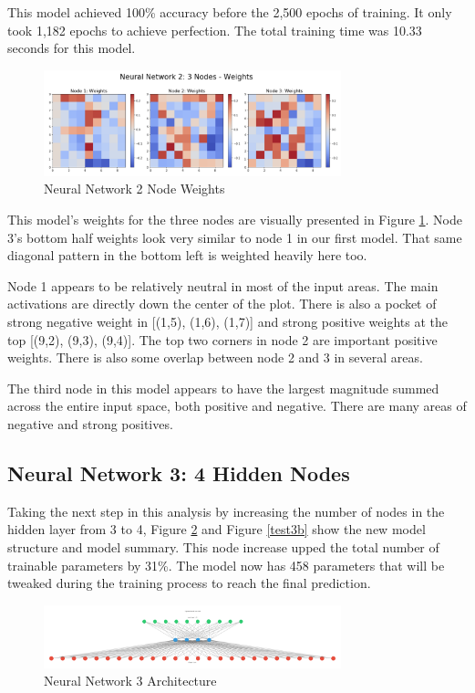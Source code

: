 \documentclass[5p,authoryear]{elsarticle}
\begin{document}
This model achieved 100\% accuracy before the 2,500 epochs of training. 
It only took 1,182 epochs to achieve perfection. 
The total training time was 10.33 seconds for this model.

\begin{figure}[!htb] \centering
	\includegraphics[width=3.4in]{figures/nn2_weights.png}
	\caption[]{Neural Network 2 Node Weights} 
	\label{test2d}
\end{figure}

This model’s weights for the three nodes are visually presented in Figure \ref{test2d}. 
Node 3’s bottom half weights look very similar to node 1 in our first model. 
That same diagonal pattern in the bottom left is weighted heavily here too. 

Node 1 appears to be relatively neutral in most of the input areas. 
The main activations are directly down the center of the plot. 
There is also a pocket of strong negative weight in [(1,5), (1,6), (1,7)] and strong positive weights at the top [(9,2), (9,3), (9,4)].
The top two corners in node 2 are important positive weights. There is also some overlap between node 2 and 3 in several areas.

The third node in this model appears to have the largest magnitude summed across the entire input space, both positive and negative. 
There are many areas of negative and strong positives. 



\subsection{Neural Network 3: 4 Hidden Nodes}\label{one}

Taking the next step in this analysis by increasing the number of nodes in the hidden layer from 3 to 4, Figure \ref{test3a} and Figure \ref{test3b} show the new model structure and model summary. 
This node increase upped the total number of trainable parameters by 31\%. 
The model now has 458 parameters that will be tweaked during the training process to reach the final prediction. 

\begin{figure}[!htb] \centering
	\includegraphics[width=3.4in]{figures/nn3.pdf}
	\caption[]{Neural Network 3 Architecture} 
	\label{test3a} 
\end{figure}
\end{document}
